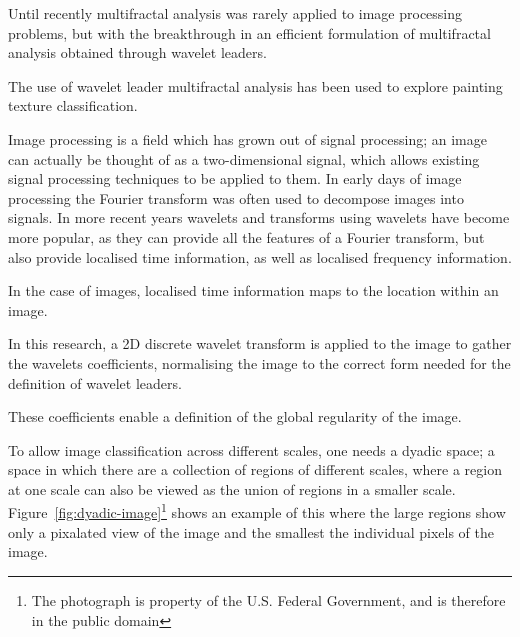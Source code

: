 \documentclass[conference]{IEEEtran}
\begin{document}
Until recently multifractal analysis was rarely applied to image processing
problems, but with the breakthrough in an efficient formulation of
multifractal analysis obtained through wavelet leaders.

The use of wavelet leader multifractal analysis has been used to explore
painting texture classification\cite{abry2013van}.

Image processing is a field which has grown out of signal processing; an image
can actually be thought of as a two-dimensional signal, which allows existing
signal processing techniques to be applied to them. In early days of image
processing the Fourier transform was often used to decompose images into
signals. In more recent years wavelets and transforms using wavelets have
become more popular, as they can provide all the features of a Fourier
transform, but also provide localised time information, as well as localised
frequency information.

In the case of images, localised time information maps to the location within
an image.

In this research, a 2D discrete wavelet transform is applied to the image to
gather the wavelets coefficients, normalising the image to the correct form
needed for the definition of wavelet leaders.

These coefficients enable a definition of the global regularity of the image.

To allow image classification across different scales, one needs a dyadic
space; a space in which there are a collection of regions of different scales,
where a region at one scale can also be viewed as the union of regions in a
smaller scale. Figure~\ref{fig:dyadic-image}\footnote{The photograph is
property of the U.S. Federal Government, and is therefore in the public
domain} shows an example of this where the large regions show only a pixalated
view of the image and the smallest the individual pixels of the image.
\end{document}
